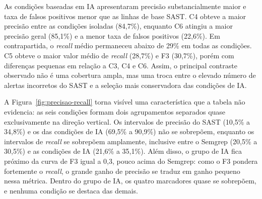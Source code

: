 \begin{table}[htb]
\ABNTEXfontereduzida
\caption{\label{tab:resultados-deteccao-condicao}Desempenho de detecção por condição experimental}
\centering
{}
\end{table}

As condições baseadas em IA apresentaram precisão substancialmente maior e taxa de
falsos positivos menor que as linhas de base SAST. C4 obteve a maior precisão entre
as condições isoladas (84,7\%), enquanto C6 atingiu a maior precisão geral (85,1\%)
e a menor taxa de falsos positivos (22,6\%). Em contrapartida, o \textit{recall}
médio permaneceu abaixo de 29\% em todas as condições. C5 obteve o maior valor médio de
\textit{recall} (28,7\%) e F3 (30,7\%), porém com diferenças pequenas em relação
a C3, C4 e C6. Assim, o principal contraste observado não é uma cobertura ampla,
mas uma troca entre o elevado número de alertas incorretos do SAST e a seleção mais
conservadora das condições de IA.

A Figura~\ref{fig:precisao-recall} torna visível uma característica que a tabela
não evidencia: as seis condições formam dois agrupamentos separados quase
exclusivamente na direção vertical. Os intervalos de precisão do SAST (10,5\% a
34,8\%) e os das condições de IA (69,5\% a 90,9\%) não se sobrepõem, enquanto os
intervalos de \textit{recall} se sobrepõem amplamente, inclusive entre o Semgrep
(20,5\% a 30,5\%) e as condições de IA (21,6\% a 35,1\%). Além disso, o grupo de IA
fica próximo da curva de F3 igual a 0,3, pouco acima do Semgrep: como o F3
pondera fortemente o \textit{recall}, o grande ganho de precisão se traduz em
ganho pequeno nessa métrica. Dentro do grupo de IA, os quatro marcadores quase se
sobrepõem, e nenhuma condição se destaca das demais.

